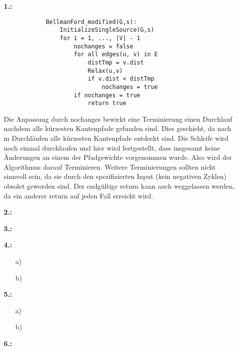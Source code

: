 \documentclass[a4paper,11pt,fleqn]{scrartcl}
\title{\titleinfo}
\author{\authorinfo}
\begin{document}
	\maketitle
	\begin{enumerate}
		\item[\textbf{1.:}] \quad \\
		\begin{verbatim}
			BellmanFord_modified(G,s):
			    InitializeSingleSource(G,s)
			    for i = 1, ..., |V| - 1
			        nochanges = false
			        for all edges(u, v) in E
			            distTmp = v.dist
			            Relax(u,v)
			            if v.dist < distTmp
			                nochanges = true
			        if nochanges = true
			            return true
		\end{verbatim}
		
		Die Anpassung durch nochanges bewirkt eine Terminierung einen Durchlauf nachdem alle kürzesten
		Kantenpfade gefunden sind. Dies geschieht, da nach m Durchläufen alle kürzesten Kantenpfade entdeckt sind.
		Die Schleife wird noch einmal durchlaufen und hier wird festgestellt, dass insgesamt keine Änderungen
		an einem der Pfadgewichte vorgenommen wurde. Also wird der Algorithmus darauf Terminieren.
		Weitere Terminierungen sollten nicht sinnvoll sein, da sie durch den spezifizierten Input (kein negativen 	
		Zyklen) obsolet geworden sind. Der endgültige return kann auch weggelassen werden, da ein anderer return 
		auf jeden Fall erreicht wird.
		\item[\textbf{2.:}] \quad \\
			\todo
		\item[\textbf{3.:}] \quad \\
			\todo
		\item[\textbf{4.:}]
		\begin{enumerate}
			\item[a)] \quad \\
				\todo
			\item[b)] \quad \\
				\todo
		\end{enumerate}
		\item[\textbf{5.:}]
		\begin{enumerate}
			\item[a)] \quad \\
				\todo
			\item[b)] \quad \\
				\todo
		\end{enumerate}
		\item[\textbf{6.:}] \quad \\
			\todo
	\end{enumerate}
\end{document}

